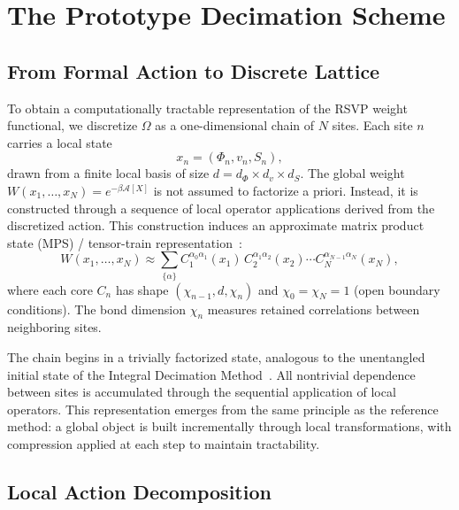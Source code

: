 \documentclass[11pt]{article}
\theoremstyle{definition}
\begin{document}
\section{The Prototype Decimation Scheme}

\subsection{From Formal Action to Discrete Lattice}

To obtain a computationally tractable representation of the RSVP weight
functional, we discretize $\Omega$ as a one-dimensional chain of $N$ sites.
Each site $n$ carries a local state
\[
  x_n = (\Phi_n, v_n, S_n),
\]
drawn from a finite local basis of size $d = d_\Phi \times d_v \times d_S$.
The global weight $W(x_1,\dots,x_N) = e^{-\beta \mathcal{A}[X]}$ is not
assumed to factorize a priori. Instead, it is constructed through a sequence of
local operator applications derived from the discretized action. This
construction induces an approximate matrix product state (MPS) / tensor-train
representation~\cite{oseledets2011tt, schollwock2011dmrg}:
\begin{equation}
  W(x_1,\dots,x_N) \approx \sum_{\{\alpha\}}
  C_1^{\alpha_0\alpha_1}(x_1)\,C_2^{\alpha_1\alpha_2}(x_2)
  \cdots C_N^{\alpha_{N-1}\alpha_N}(x_N),
  \label{eq:MPS}
\end{equation}
where each core $C_n$ has shape $(\chi_{n-1}, d, \chi_n)$ and $\chi_0 =
\chi_N = 1$ (open boundary conditions). The bond dimension $\chi_n$ measures
retained correlations between neighboring sites.

The chain begins in a trivially factorized state, analogous to the
unentangled initial state of the Integral Decimation Method~\cite{grimm2026}.
All nontrivial dependence between sites is accumulated through the sequential
application of local operators. This representation emerges from the same
principle as the reference method: a global object is built incrementally
through local transformations, with compression applied at each step to
maintain tractability.

\subsection{Local Action Decomposition}
\end{document}
